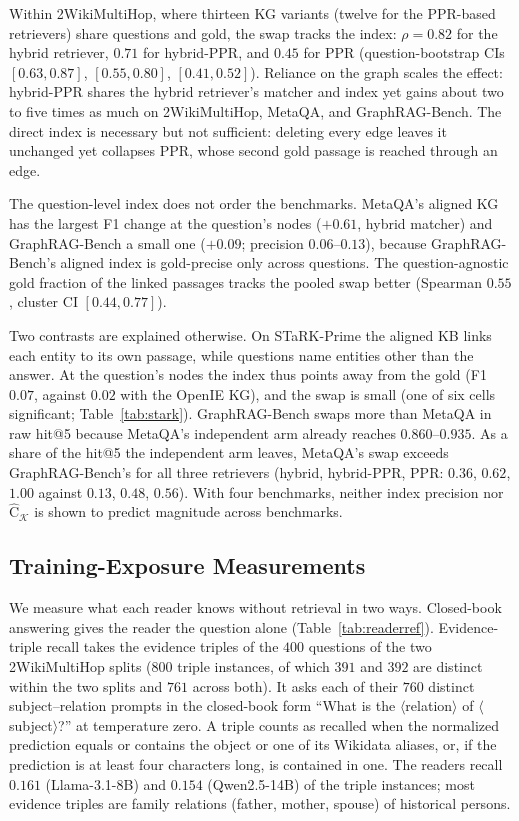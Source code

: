 \documentclass[11pt]{article}
\newcommand{\Chat}{\widehat{\mathrm{C}}}
\newcommand{\kg}{\mathcal{K}}
\begin{document}
Within 2WikiMultiHop, where thirteen KG variants (twelve for the PPR-based retrievers) share questions and gold, the swap tracks the index: $\rho=0.82$ for the hybrid retriever, $0.71$ for hybrid-PPR, and $0.45$ for PPR (question-bootstrap CIs $[0.63,0.87]$, $[0.55,0.80]$, $[0.41,0.52]$). Reliance on the graph scales the effect: hybrid-PPR shares the hybrid retriever's matcher and index yet gains about two to five times as much on 2WikiMultiHop, MetaQA, and GraphRAG-Bench. The direct index is necessary but not sufficient: deleting every edge leaves it unchanged yet collapses PPR, whose second gold passage is reached through an edge.

The question-level index does not order the benchmarks. MetaQA's aligned KG has the largest F1 change at the question's nodes ($+0.61$, hybrid matcher) and GraphRAG-Bench a small one ($+0.09$; precision $0.06$--$0.13$), because GraphRAG-Bench's aligned index is gold-precise only across questions. The question-agnostic gold fraction of the linked passages tracks the pooled swap better (Spearman $0.55$, cluster CI $[0.44,0.77]$).

Two contrasts are explained otherwise. On STaRK-Prime the aligned KB links each entity to its own passage, while questions name entities other than the answer. At the question's nodes the index thus points away from the gold (F1 $0.07$, against $0.02$ with the OpenIE KG), and the swap is small (one of six cells significant; Table~\ref{tab:stark}). GraphRAG-Bench swaps more than MetaQA in raw hit@5 because MetaQA's independent arm already reaches $0.860$--$0.935$. As a share of the hit@5 the independent arm leaves, MetaQA's swap exceeds GraphRAG-Bench's for all three retrievers (hybrid, hybrid-PPR, PPR: $0.36$, $0.62$, $1.00$ against $0.13$, $0.48$, $0.56$). With four benchmarks, neither index precision nor $\Chat_{\kg}$ is shown to predict magnitude across benchmarks.

\subsection{Training-Exposure Measurements}
\label{app:memorization}
We measure what each reader knows without retrieval in two ways. Closed-book answering gives the reader the question alone (Table~\ref{tab:readerref}). Evidence-triple recall takes the evidence triples of the $400$ questions of the two 2WikiMultiHop splits ($800$ triple instances, of which $391$ and $392$ are distinct within the two splits and $761$ across both). It asks each of their $760$ distinct subject--relation prompts in the closed-book form ``What is the $\langle$relation$\rangle$ of $\langle$subject$\rangle$?'' at temperature zero. A triple counts as recalled when the normalized prediction equals or contains the object or one of its Wikidata aliases, or, if the prediction is at least four characters long, is contained in one. The readers recall $0.161$ (Llama-3.1-8B) and $0.154$ (Qwen2.5-14B) of the triple instances; most evidence triples are family relations (father, mother, spouse) of historical persons.
\end{document}
